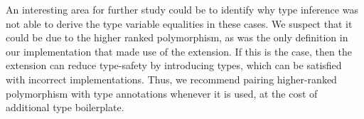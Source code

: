 An interesting area for further study could be to identify why type inference was not able to derive the type variable equalities in these cases. We suspect that it could be due to the higher ranked polymorphism, as  was the only definition in our implementation that made use of the  extension. If this is the case, then the  extension can reduce type-safety by introducing  types, which can be satisfied with incorrect implementations. Thus, we recommend pairing higher-ranked polymorphism with type annotations whenever it is used, at the cost of additional type boilerplate.
